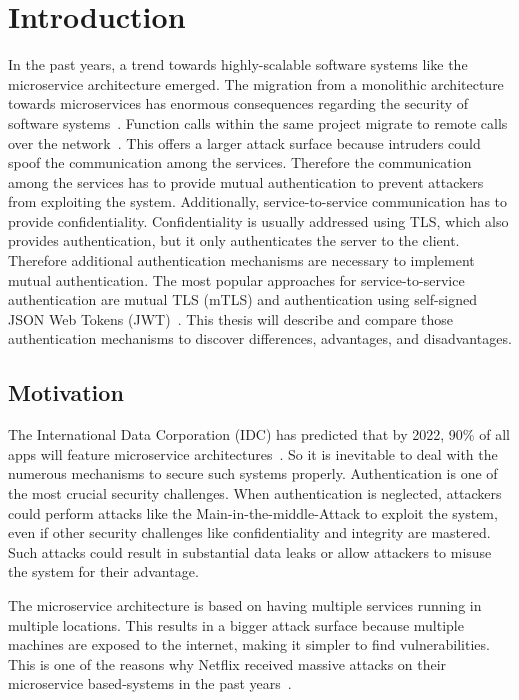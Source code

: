 \chapter{Introduction}
\label{cha:Introduction}
In the past years, a trend towards highly-scalable software systems like the microservice architecture emerged.
The migration from a monolithic architecture towards microservices has enormous consequences regarding the security of software systems~\cite{shmeleva2020microservices}. 
Function calls within the same project migrate to remote calls over the network~\cite{chandramouli2019microservices}. 
This offers a larger attack surface because intruders could spoof the communication among the services.
Therefore the communication among the services has to provide mutual authentication to prevent attackers from exploiting the system.
Additionally, service-to-service communication has to provide confidentiality.
Confidentiality is usually addressed using TLS, which also provides authentication, but it only authenticates the server to the client.
Therefore additional authentication mechanisms are necessary to implement mutual authentication.
The most popular approaches for service-to-service authentication are mutual TLS (mTLS) and authentication using self-signed JSON Web Tokens (JWT)~\cite{dias2020microservices}.
This thesis will describe and compare those authentication mechanisms to discover differences, advantages, and disadvantages.

\section{Motivation}
The International Data Corporation (IDC) has predicted that by 2022, 90\% of all apps will feature microservice architectures~\cite{idcprediction2019}. 
So it is inevitable to deal with the numerous mechanisms to secure such systems properly. 
Authentication is one of the most crucial security challenges.
When authentication is neglected, attackers could perform attacks like the Main-in-the-middle-Attack to exploit the system, even if other security challenges like confidentiality and integrity are mastered.
Such attacks could result in substantial data leaks or allow attackers to misuse the system for their advantage.

The microservice architecture is based on having multiple services running in multiple locations.
This results in a bigger attack surface because multiple machines are exposed to the internet, making it simpler to find vulnerabilities.
This is one of the reasons why Netflix received massive attacks on their microservice based-systems in the past years~\cite{pereira2019security}.

